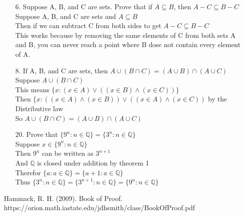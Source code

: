 \documentclass[sigconf]{article}
\begin{document}
\begin{itemize}
  \item[6.] Suppose A, B, and C are sets. Prove that if $A\subseteq B$, then $A-C\subseteq B-C$\\
            Suppose A, B, and C are sets and $A\subseteq B$\\
            Then if we can subtract C from both sides to get $A-C\subseteq B-C$\\
            \hspace*{5mm} This works because by removing the same elements of C from both sets A and B, you can never reach a point where B dose not contain every element of A.


  \item[8.] If A, B, and C are sets, then $A\cup(B\cap C)=(A\cup B)\cap(A\cup C)$\\
            Suppose $A\cup(B\cap C)$\\
            This means $\{x:(x\in A)\lor((x\in B)\land(x\in C))\}$\\
            Then $\{x:((x\in A)\land(x\in B))\lor((x\in A)\land(x\in C))$ by the Distributive law\\
            So $A\cup(B\cap C)=(A\cup B)\cap(A\cup C)$


  \item[20.] Prove that $\{9^n:n\in\mathbb{Q}\}=\{3^n:n\in\mathbb{Q}\}$\\
            Suppose $x\in \{9^n:n\in\mathbb{Q}\}$\\
            Then $9^n$ can be written as $3^{n+1}$\\
            And $\mathbb{Q}$ is closed under addition by theorem 1\\
            Therefor $\{a:a\in\mathbb{Q}\}=\{a+1:a\in\mathbb{Q}\}$\\
            Thus $\{3^n:n\in\mathbb{Q}\}=\{3^{n+1}:n\in\mathbb{Q}\}=\{9^n:n\in\mathbb{Q}\}$


\end{itemize}


Hammack, R. H. (2009). Book of Proof.\\ https://orion.math.iastate.edu/jdhsmith/class/BookOfProof.pdf



\end{document}
